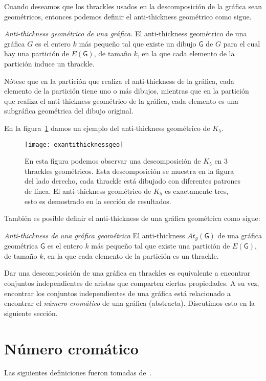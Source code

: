 Cuando deseamos que los thrackles usados en la descomposición de la gráfica sean
geométricos, entonces podemos definir el anti-thickness geométrico como sigue.
\begin{definition}{\emph{Anti-thickness geométrico de una gráfica.}}
El anti-thickness geométrico de una gráfica $G$ es el entero $k$ más pequeño
tal que existe un dibujo $\mathsf{G}$ de $G$ para el cual hay una partición de
$E(\mathsf{G})$, de tamaño $k$, en la que cada elemento de la partición induce
un thrackle.
\end{definition}
Nótese que en la partición que realiza el anti-thickness de la gráfica, cada
elemento de la partición tiene uno o más dibujos, mientras que en la partición
que realiza el anti-thickness geométrico de la gráfica, cada elemento es una
subgráfica geométrica del dibujo original.

En la figura~\ref{fig:exantithicknessgeo} damos un ejemplo del anti-thickness
geométrico de $K_5$.
\begin{figure}[htpb]
  \centering
  \texttt{[image: exantithicknessgeo]}
  \caption{En esta figura podemos observar una descomposición de $K_5$ en 3
  thrackles geométricos. Esta descomposición se muestra en la figura del lado
  derecho, cada thrackle está dibujado con diferentes patrones de línea. El
  anti-thickness geométrico de $K_5$ es exactamente tres, esto es demostrado en
  la sección de resultados.} %
  \label{fig:exantithicknessgeo}
\end{figure}

También es posible definir el anti-thickness de una gráfica geométrica como sigue:
\begin{definition}{\emph{Anti-thickness de una gráfica geométrica}}
  \label{definicion:at_dibujo}
  El anti-thickness $At_g(\mathsf{G})$ de una gráfica geométrica $\mathsf{G}$
  es el entero $k$ más pequeño tal que existe una partición de $E(\mathsf{G})$, de tamaño $k$, en la que cada elemento de la partición es un thrackle.
\end{definition}

Dar una descomposición de una gráfica en thrackles es equivalente a encontrar
conjuntos independientes de aristas que comparten ciertas propiedades. A su vez,
encontrar los conjuntos independientes de una gráfica está relacionado a
encontrar el \emph{número cromático} de una gráfica (abstracta). Discutimos
esto en la siguiente sección.

\section{Número cromático}
Las siguientes definiciones fueron tomadas de~\cite{Chartrand2008}.


